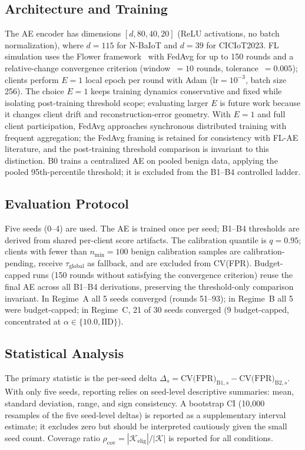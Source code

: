 \subsection{Architecture and Training}
The AE encoder has dimensions $[d, 80, 40, 20]$ (ReLU activations, no batch normalization),
where $d=115$ for N-BaIoT and $d=39$ for CICIoT2023.
FL simulation uses the Flower framework~\cite{beutel2020flower} with FedAvg
for up to 150 rounds and a relative-change convergence criterion
(window~$= 10$ rounds, tolerance~$= 0.005$); clients perform $E{=}1$ local epoch
per round with Adam ($\text{lr}=10^{-3}$, batch size 256).
The choice $E{=}1$ keeps training dynamics conservative and fixed while isolating
post-training threshold scope; evaluating larger $E$ is future work because it changes
client drift and reconstruction-error geometry.
With $E{=}1$ and full client participation, FedAvg approaches synchronous distributed
training with frequent aggregation; the FedAvg framing is retained for consistency with
FL-AE literature, and the post-training threshold comparison is invariant to this distinction.
B0 trains a centralized AE on pooled benign data, applying the pooled 95th-percentile
threshold; it is excluded from the B1--B4 controlled ladder.

\subsection{Evaluation Protocol}
Five seeds (0--4) are used. The AE is trained once per seed; B1--B4 thresholds
are derived from shared per-client score artifacts.
The calibration quantile is $q=0.95$;
clients with fewer than $n_{\min}=100$ benign calibration samples are calibration-pending,
receive $\tau_{\text{global}}$ as fallback, and are excluded from CV(FPR).
Budget-capped runs (150 rounds without satisfying the convergence criterion) reuse
the final AE across all B1--B4 derivations, preserving the threshold-only
comparison invariant.
In Regime~A all 5 seeds converged (rounds 51--93);
in Regime~B all 5 were budget-capped;
in Regime~C, 21 of 30 seeds converged (9 budget-capped, concentrated at $\alpha\in\{10.0,\mathrm{IID}\}$).

\subsection{Statistical Analysis}
The primary statistic is the per-seed delta $\Delta_s = \text{CV(FPR)}_{\text{B1},s} - \text{CV(FPR)}_{\text{B2},s}$.
With only five seeds, reporting relies on seed-level descriptive summaries:
mean, standard deviation, range, and sign consistency.
A bootstrap CI (10{,}000 resamples of the five seed-level deltas) is reported as a
supplementary interval estimate; it excludes zero but should be interpreted cautiously
given the small seed count.
Coverage ratio $\rho_{\text{cov}} = |\mathcal{K}_{\mathrm{elig}}| / |\mathcal{K}|$ is reported for all conditions.

